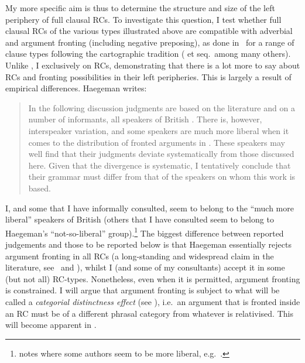 \documentclass[output=paper]{langsci/langscibook}
\begin{document}
My more specific aim is thus to determine the structure and size of the left
periphery of full clausal \glspl{RC}. To investigate this question, I test
whether full clausal \glspl{RC} of the various types illustrated above are
compatible with adverbial and argument fronting (including negative preposing),
as done in~\textcite{Haegeman2012} for a range of clause types following the
cartographic tradition (\citealt{Rizzi1997} et seq.\ among many others).
Unlike \textcite{Haegeman2012}, I  exclusively on RCs, demonstrating that
there is a lot more to say about \glspl{RC} and fronting possibilities in their
left peripheries. This is largely a result of empirical differences. Haegeman
writes:

\begin{quote}In the following discussion judgments are based on the literature and on a
number of informants, all speakers of British . There is, however,
interspeaker variation, and some speakers are much more liberal when it comes
to the distribution of fronted arguments in . These speakers may well
find that their judgments deviate systematically from those discussed here.
Given that the divergence is systematic, I tentatively conclude that their
grammar must differ from that of the speakers on whom this work is based.
\parencite[54]{Haegeman2012} \end{quote}

I, and some that I have informally consulted, seem to belong to the
\enquote{much more liberal} speakers of British  (others that I have
consulted seem to belong to Haegeman’s \enquote{not-so-liberal}
group).\footnote{\textcite{Haegeman2012} notes where some authors seem to be
more liberal, e.g.\ \textcite{Radford2009}.} The biggest difference between
 reported judgements and those to be reported below is
that Haegeman essentially rejects argument fronting in all \glspl{RC} (a
long-standing and widespread claim in the literature,
see~\citealt{Chomsky1977} and \citealt{Bak1984}), whilst I (and some of my
consultants) accept it in some (but not all) RC-types. Nonetheless, even when
it is permitted, argument fronting is constrained. I will argue that argument
fronting is subject to what will be called a \emph{categorial distinctness
effect} (see \citealt{Richards2010}), i.e.\ an argument that is fronted inside
an \gls{RC} must be of a different phrasal category from
whatever is relativised.  This will become apparent in .
\end{document}
